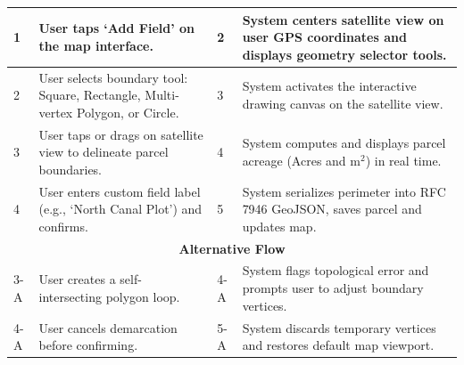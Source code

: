 \documentclass{FastFyp}
\begin{document}
\begin{table}[!ht]
\begin{tabular}{|lllll|}
\multicolumn{1}{|p{0.8cm}|}{1} &
  \multicolumn{2}{p{6.0cm}|}{User taps `Add Field' on the map interface.} &
  \multicolumn{1}{p{0.8cm}|}{2} &
  \multicolumn{1}{p{5.6cm}|}{System centers satellite view on user GPS coordinates and displays geometry selector tools.} \\ \hline
\multicolumn{1}{|p{0.8cm}|}{2} &
  \multicolumn{2}{p{6.0cm}|}{User selects boundary tool: Square, Rectangle, Multi-vertex Polygon, or Circle.} &
  \multicolumn{1}{p{0.8cm}|}{3} &
  \multicolumn{1}{p{5.6cm}|}{System activates the interactive drawing canvas on the satellite view.} \\ \hline
\multicolumn{1}{|p{0.8cm}|}{3} &
  \multicolumn{2}{p{6.0cm}|}{User taps or drags on satellite view to delineate parcel boundaries.} &
  \multicolumn{1}{p{0.8cm}|}{4} &
  \multicolumn{1}{p{5.6cm}|}{System computes and displays parcel acreage (Acres and $\text{m}^2$) in real time.} \\ \hline
\multicolumn{1}{|p{0.8cm}|}{4} &
  \multicolumn{2}{p{6.0cm}|}{User enters custom field label (e.g., `North Canal Plot') and confirms.} &
  \multicolumn{1}{p{0.8cm}|}{5} &
  \multicolumn{1}{p{5.6cm}|}{System serializes perimeter into RFC 7946 GeoJSON, saves parcel and updates map.} \\ \hline
\multicolumn{5}{|c|}{\textbf{Alternative Flow}} \\ \hline
\multicolumn{1}{|p{0.8cm}|}{3-A} &
  \multicolumn{2}{p{6.0cm}|}{User creates a self-intersecting polygon loop.} &
  \multicolumn{1}{p{0.8cm}|}{4-A} &
  \multicolumn{1}{p{5.6cm}|}{System flags topological error and prompts user to adjust boundary vertices.} \\ \hline
\multicolumn{1}{|p{0.8cm}|}{4-A} &
  \multicolumn{2}{p{6.0cm}|}{User cancels demarcation before confirming.} &
  \multicolumn{1}{p{0.8cm}|}{5-A} &
  \multicolumn{1}{p{5.6cm}|}{System discards temporary vertices and restores default map viewport.} \\ \hline
\end{tabular}
\end{table}
\end{document}
